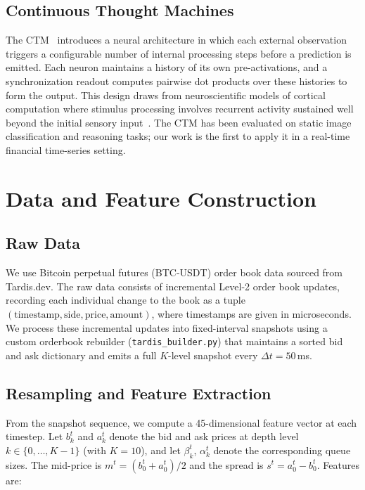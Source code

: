 \documentclass[11pt]{article}
\begin{document}
\subsection{Continuous Thought Machines}

The CTM~\citep{sakana2025ctm} introduces a neural architecture in which each
external observation triggers a configurable number of internal processing
steps before a prediction is emitted. Each neuron maintains a history of its
own pre-activations, and a synchronization readout computes pairwise dot
products over these histories to form the output. This design draws from
neuroscientific models of cortical computation where stimulus processing
involves recurrent activity sustained well beyond the initial sensory
input~\citep{lamme2000distinct}. The CTM has been evaluated on static
image classification and reasoning tasks; our work is the first to apply it
in a real-time financial time-series setting.

\section{Data and Feature Construction}
\label{sec:data}

\subsection{Raw Data}

We use Bitcoin perpetual futures (BTC-USDT) order book data sourced from
Tardis.dev. The raw data consists of incremental Level-2 order book updates,
recording each individual change to the book as a tuple
$(\text{timestamp}, \text{side}, \text{price}, \text{amount})$, where
timestamps are given in microseconds. We process these incremental updates
into fixed-interval snapshots using a custom orderbook rebuilder
(\texttt{tardis\_builder.py}) that maintains a sorted bid and ask dictionary
and emits a full $K$-level snapshot every $\Delta t = 50$\,ms.

\subsection{Resampling and Feature Extraction}

From the snapshot sequence, we compute a 45-dimensional feature vector at
each timestep. Let $b_k^t$ and $a_k^t$ denote the bid and ask prices at
depth level $k \in \{0, \ldots, K-1\}$ (with $K = 10$), and let
$\beta_k^t$, $\alpha_k^t$ denote the corresponding queue sizes. The mid-price
is $m^t = (b_0^t + a_0^t) / 2$ and the spread is
$s^t = a_0^t - b_0^t$. Features are:
\end{document}
